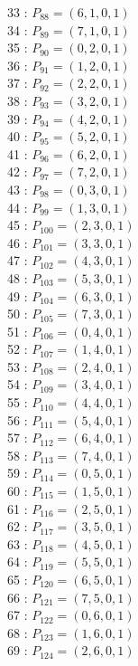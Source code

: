 \documentclass{article}
\begin{document}
{\begin{multicols}{3}
33 : $P_{88}=( 6, 1, 0, 1 )$\\
34 : $P_{89}=( 7, 1, 0, 1 )$\\
35 : $P_{90}=( 0, 2, 0, 1 )$\\
36 : $P_{91}=( 1, 2, 0, 1 )$\\
37 : $P_{92}=( 2, 2, 0, 1 )$\\
38 : $P_{93}=( 3, 2, 0, 1 )$\\
39 : $P_{94}=( 4, 2, 0, 1 )$\\
40 : $P_{95}=( 5, 2, 0, 1 )$\\
41 : $P_{96}=( 6, 2, 0, 1 )$\\
42 : $P_{97}=( 7, 2, 0, 1 )$\\
43 : $P_{98}=( 0, 3, 0, 1 )$\\
44 : $P_{99}=( 1, 3, 0, 1 )$\\
45 : $P_{100}=( 2, 3, 0, 1 )$\\
46 : $P_{101}=( 3, 3, 0, 1 )$\\
47 : $P_{102}=( 4, 3, 0, 1 )$\\
48 : $P_{103}=( 5, 3, 0, 1 )$\\
49 : $P_{104}=( 6, 3, 0, 1 )$\\
50 : $P_{105}=( 7, 3, 0, 1 )$\\
51 : $P_{106}=( 0, 4, 0, 1 )$\\
52 : $P_{107}=( 1, 4, 0, 1 )$\\
53 : $P_{108}=( 2, 4, 0, 1 )$\\
54 : $P_{109}=( 3, 4, 0, 1 )$\\
55 : $P_{110}=( 4, 4, 0, 1 )$\\
56 : $P_{111}=( 5, 4, 0, 1 )$\\
57 : $P_{112}=( 6, 4, 0, 1 )$\\
58 : $P_{113}=( 7, 4, 0, 1 )$\\
59 : $P_{114}=( 0, 5, 0, 1 )$\\
60 : $P_{115}=( 1, 5, 0, 1 )$\\
61 : $P_{116}=( 2, 5, 0, 1 )$\\
62 : $P_{117}=( 3, 5, 0, 1 )$\\
63 : $P_{118}=( 4, 5, 0, 1 )$\\
64 : $P_{119}=( 5, 5, 0, 1 )$\\
65 : $P_{120}=( 6, 5, 0, 1 )$\\
66 : $P_{121}=( 7, 5, 0, 1 )$\\
67 : $P_{122}=( 0, 6, 0, 1 )$\\
68 : $P_{123}=( 1, 6, 0, 1 )$\\
69 : $P_{124}=( 2, 6, 0, 1 )$\\

\end{multicols}}
\end{document}
